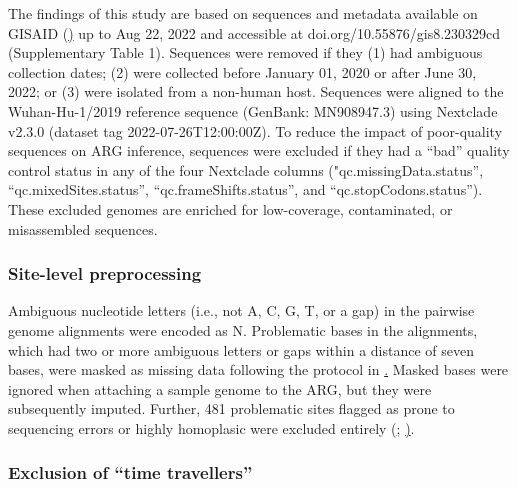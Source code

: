 \documentclass{article}
\begin{document}
The findings of this study are based on sequences and metadata available on
GISAID (\href{https://gisaid.org/}) up to Aug 22, 2022 and accessible at
doi.org/10.55876/gis8.230329cd (Supplementary Table 1). Sequences were removed
if they (1) had ambiguous collection dates; (2) were collected before January
01, 2020 or after June 30, 2022; or (3) were isolated from a non-human host.
Sequences were aligned to the Wuhan-Hu-1/2019 reference sequence (GenBank:
MN908947.3) using Nextclade v2.3.0 \cite{Aksamentov2021-hj} (dataset tag
2022-07-26T12:00:00Z). To reduce the impact of poor-quality sequences on ARG
inference, sequences were excluded if they had a “bad” quality control status
in any of the four Nextclade columns ("qc.missingData.status”,
“qc.mixedSites.status”, “qc.frameShifts.status”, and “qc.stopCodons.status”).
These excluded genomes are enriched for low-coverage, contaminated, or
misassembled sequences.

\subsubsection{Site-level preprocessing}

Ambiguous nucleotide letters (i.e., not A, C, G, T, or a gap) in the pairwise
genome alignments were encoded as N. Problematic bases in the alignments, which
had two or more ambiguous letters or gaps within a distance of seven bases,
were masked as missing data following the protocol in
\href{https://github.com/roblanf/sarscov2phylo/}. Masked bases were ignored
when attaching a sample genome to the ARG, but they were subsequently imputed.
Further, 481 problematic sites flagged as prone to sequencing errors or highly
homoplasic were excluded entirely
(\href{https://virological.org/t/issues-with-sars-cov-2-sequencing-data/473};
\href{https://raw.githubusercontent.com/W-L/ProblematicSites_SARS-CoV2/master/problematic_sites_sarsCov2.vcf}).

\subsubsection{Exclusion of “time travellers”}
\end{document}
